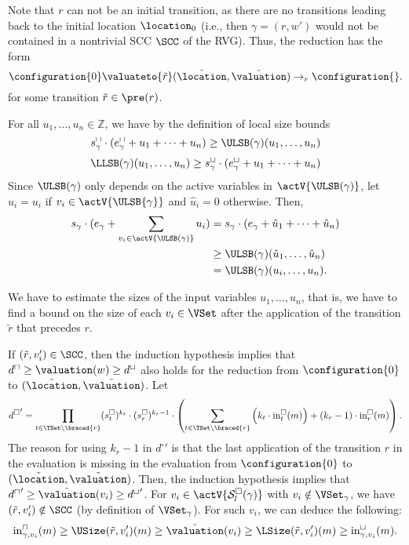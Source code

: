Note that $r$ can not be an initial transition, as there are no transitions leading back to the initial location $\location_0$
(i.e., then $\gamma = (r, w')$ would not be contained in a nontrivial SCC $\SCC$ of the RVG).
Thus, the reduction has the form
\[ \configuration{0} \valuateto{\tilde{r}} (\tilde{\location}, \tilde{\valuation}) \rightarrow_r \configuration{}. \]
for some transition $\tilde{r} \in \pre(r)$.

For all $u_1, \dots, u_n \in \mathbb{Z}$, we have by the definition of local size bounds
\[ s^\sqcap_\gamma \cdot (e^\sqcap_\gamma + u_1 + \dots + u_n) \geq \ULSB(\gamma)(u_1, \dots, u_n) \]
\[ \LLSB(\gamma)(u_1, \dots, u_n) \geq s^\sqcup_\gamma \cdot (e^\sqcup_\gamma + u_1 + \dots + u_n) \]
Since $\ULSB(\gamma)$ only depends on the active variables in $\actV{\ULSB(\gamma)}$, let $\hat{u}_i = u_i$ if $v_i \in \actV{\ULSB{\gamma}}$ and $\hat{u}_i = 0$ otherwise.
Then,
\begin{align*}
  s_\gamma \cdot (e_\gamma + \sum_{v_i \in \actV{\ULSB(\gamma)}} u_i) &= s_\gamma \cdot (e_\gamma + \hat{u}_1 + \dots + \hat{u}_n) \\
  & \geq \ULSB(\gamma)(\hat{u}_1, \dots, \hat{u}_n) \\
  &= \ULSB(\gamma)(u_i, \dots, u_n).
\end{align*}

We have to estimate the sizes of the input variables $u_1, \dots, u_n$,
that is, we have to find a bound on the size of each $v_i \in \VSet$ after the application of the transition $\tilde{r}$ that precedes $r$.

If $(\tilde{r}, v'_i) \in \SCC$, then the induction hypothesis implies that $d^\sqcap \geq \valuation(w) \geq d^\sqcup$ also holds for the reduction from $\configuration{0}$ to $(\tilde{\location}, \tilde{\valuation})$.
Let
\[ {d^\square}' = \prod_{t \in \TSet \setminus \braced{r}} (s^\square_t)^{k_t} \cdot (s^\square_r)^{k_r - 1} \cdot \left( \sum_{t \in \TSet \setminus \braced{r}} \left( k_t \cdot \text{in}^\square_t(m) \right) + \left( k_r - 1 \right) \cdot \text{in}^\square_r(m) \right). \]
The reason for using $k_r - 1$ in ${d^\square}'$ is that the last application of the transition $r$ in the evaluation is missing in the evaluation from $\configuration{0}$ to $(\tilde{\location}, \tilde{\valuation})$.
Then, the induction hypothesis implies that ${d^\sqcap}' \geq \tilde{\valuation}(v_i) \geq {d^\sqcup}'$.
For $v_i \in \actV{\mathcal{S}^\square_l(\gamma)}$ with $v_i \notin \VSet_\gamma$, we have $(\tilde{r}, v'_i) \notin \SCC$ (by definition of $\VSet_\gamma$).
For such $v_i$, we can deduce the following:
\[ \text{in}^\sqcap_{\gamma,{v_i}}(m) \geq \USize(\tilde{r}, v'_i)(m) \geq \tilde{\valuation}(v_i) \geq \LSize(\tilde{r}, v'_i)(m) \geq \text{in}^\sqcup_{\gamma,{v_i}}(m). \]

